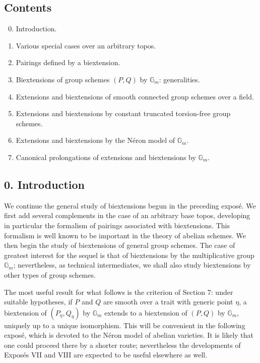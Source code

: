 \documentclass[11pt]{article}
\newcommand{\Gm}{\mathbb G_m}
\begin{document}
\subsection*{Contents}

\begin{enumerate}[label=\arabic*.]
\setcounter{enumi}{-1}
\item Introduction.
\item Various special cases over an arbitrary topos.
\item Pairings defined by a biextension.
\item Biextensions of group schemes \((P,Q)\) by \(\Gm\): generalities.
\item Extensions and biextensions of smooth connected group schemes over a field.
\item Extensions and biextensions by constant truncated torsion-free group schemes.
\item Extensions and biextensions by the Néron model of \(\Gm\).
\item Canonical prolongations of extensions and biextensions by \(\Gm\).
\end{enumerate}

\subsection*{0. Introduction}

We continue the general study of biextensions begun in the preceding exposé. We
first add several complements in the case of an arbitrary base topos, developing
in particular the formalism of pairings associated with biextensions. This
formalism is well known to be important in the theory of abelian schemes. We then
begin the study of biextensions of general group schemes. The case of greatest
interest for the sequel is that of biextensions by the multiplicative group
\(\Gm\); nevertheless, as technical intermediates, we shall also study
biextensions by other types of group schemes.

The most useful result for what follows is the criterion of Section 7: under
suitable hypotheses, if \(P\) and \(Q\) are smooth over a trait with generic point
\(\eta\), a biextension of \((P_\eta,Q_\eta)\) by \(\Gm\) extends to a
biextension of \((P,Q)\) by \(\Gm\), uniquely up to a unique isomorphism. This
will be convenient in the following exposé, which is devoted to the Néron model
of abelian varieties. It is likely that one could proceed there by a shorter
route; nevertheless the developments of Exposés VII and VIII are expected to be
useful elsewhere as well.
\end{document}
